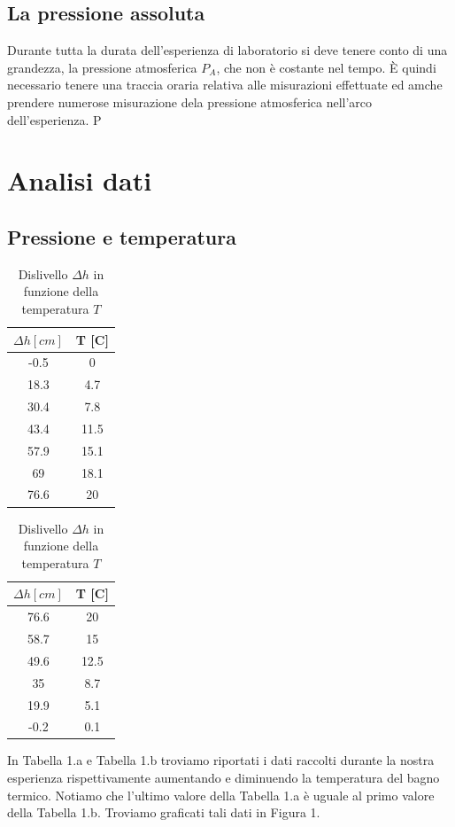\subsection{La pressione assoluta}
Durante tutta la durata dell'esperienza di laboratorio si deve tenere conto di una grandezza, la pressione atmosferica $P_A$, che non è costante nel tempo.
È quindi necessario tenere una traccia oraria relativa alle misurazioni effettuate ed amche prendere numerose misurazione dela pressione atmosferica nell'arco dell'esperienza.
P


\section{Analisi dati}
\subsection{Pressione e temperatura}

\begin{table}[H]
\centering

	\begin{subtable}{.5\textwidth}
		\centering
		\begin{tabular}{|c|c|} \hline
			\textbf{$\Delta h {[cm]}$ } & \textbf{T {[\degree C]} }  \\ \hline
			-0.5 & 0  \\ \hline
			18.3 & 4.7  \\ \hline
			30.4 & 7.8  \\ \hline
			43.4 & 11.5  \\ \hline
			57.9 & 15.1  \\ \hline
			69 & 18.1  \\ \hline
			76.6 & 20  \\ \hline
		\end{tabular}
		\caption{Aumento della temperatura}
	\end{subtable}%
	\begin{subtable}{.5\textwidth}
	\centering
	\begin{tabular}{|c|c|} \hline
		\textbf{$\Delta h {[cm]}$ } & \textbf{T {[\degree C]} }  \\ \hline
		76.6 & 20  \\ \hline
		58.7 & 15  \\ \hline
		49.6 & 12.5  \\ \hline
		35 & 8.7  \\ \hline
		19.9 & 5.1  \\ \hline
		-0.2 & 0.1  \\ \hline
	\end{tabular}
	\caption{Diminuzione della temperatura}
\end{subtable}

\caption{Dislivello $\Delta h$ in funzione della temperatura $T$}
\end{table}
In Tabella 1.a e Tabella 1.b troviamo riportati i dati raccolti durante la nostra esperienza rispettivamente aumentando e diminuendo la temperatura del bagno termico. 
Notiamo che l'ultimo valore della Tabella 1.a è uguale al primo valore della Tabella 1.b.
Troviamo graficati tali dati in Figura 1. 

